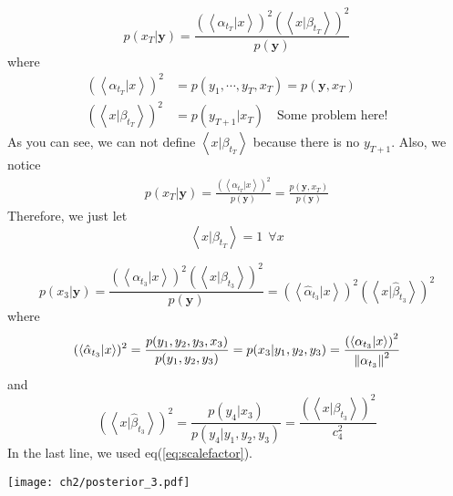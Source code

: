 \begin{definition}
\label{specialposterior}
\begin{equation}
p(x_T | \textbf{y}) =\frac{(\left<\alpha_{t_T}|x \right>)^2 (\left<x|\beta_{t_T} \right>)^2 }{p(\textbf{y})}
\end{equation}
where
\begin{align}
        (\left<\alpha_{t_T}|x \right>)^2 &=  p(y_1,\cdots,y_T,x_T) = p(\textbf{y}, x_T) \\
        (\left<x|\beta_{t_T} \right>)^2 &= p(y_{T+1}|x_T)\text{~~~Some problem here!}
\end{align}
As you can see, we can not define $\left<x|\beta_{t_T} \right>$ because there is no $y_{T+1}$. Also, we notice
\begin{align*}
        p(x_T | \textbf{y}) = \frac{(\left<\alpha_{t_T}|x \right>)^2}{p(\textbf{y})} = \frac{p(\textbf{y}, x_T)}{p(\textbf{y})}
\end{align*}
Therefore, we just let
\begin{equation}
        \left<x|\beta_{t_T} \right>=1~~\forall x
\end{equation}
\end{definition}

\begin{definition}[$p(x_3|\textbf{y})$]
\begin{equation}
        p(x_3|\textbf{y}) = \frac{(\left<\alpha_{t_{3}}|x \right>)^2 (\left<x|\beta_{t_{3}} \right>)^2 }{p(\textbf{y})} 
        = (\left<\hat{\alpha}_{t_{3}}|x \right>)^2 \left(\left<x|\hat{\beta}_{t_{3}} \right>\right)^2
\end{equation}
where
\begin{equation}
        (\left<\hat{\alpha}_{t_{3}}|x \right>)^2 = 
        \frac{p(y_1,y_2,y_3, x_3)}{p(y_1,y_2,y_3)} =
        p(x_3|y_1,y_2,y_3)=
        \frac{\left(\left< \alpha_{t_3} | x \right>\right)^2}{\left\lVert\alpha_{t_3}\right\rVert^2}   
\end{equation}
and
\begin{equation}
        \left(\left<x|\hat{\beta}_{t_{3}} \right>\right)^2 = \frac{p(y_4|x_3)}{p(y_4|y_1,y_2,y_3)} 
        =  \frac{ (\left<x|\beta_{t_{3}} \right>)^2 }{ c_4^2 }
\end{equation}
In the last line, we used eq(\ref{eq:scalefactor}).
\begin{center}
        \texttt{[image: ch2/posterior\_3.pdf]}
\end{center}   
\end{definition}